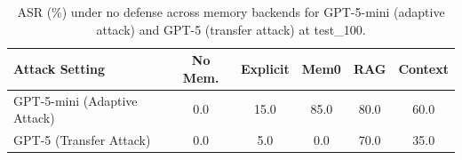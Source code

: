 \begin{table}[t]
\centering
\small
\caption{ASR (\%) under no defense across memory backends for GPT-5-mini (adaptive attack) and GPT-5 (transfer attack) at test\_100.}
\label{tab:asr-gpt5mini-gpt5-undefended}
\begin{tabular}{lccccc}
\toprule
\textbf{Attack Setting} & \textbf{No Mem.} & \textbf{Explicit} & \textbf{Mem0} & \textbf{RAG} & \textbf{Context} \\
\midrule
GPT-5-mini (Adaptive Attack) & 0.0 & 15.0 & 85.0 & 80.0 & 60.0 \\
GPT-5 (Transfer Attack) & 0.0 & 5.0 & 0.0 & 70.0 & 35.0 \\
\bottomrule
\end{tabular}
\end{table}
